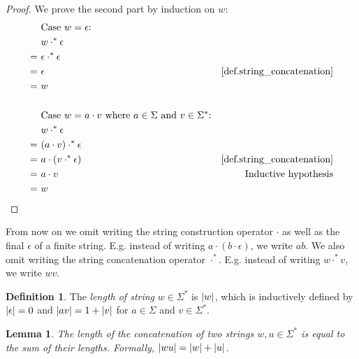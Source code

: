 \documentclass{report}
\DeclarePairedDelimiter{\abs}{\lvert}{\rvert}
\newtheorem{lemma}[theorem]{Lemma}
\theoremstyle{definition}
\newtheorem{definition}[theorem]{Definition}
\begin{document}
\begin{appendices}
\begin{proof}
We prove the second part by induction on $w$:
\begin{align*}
& \text{Case } w = \epsilon \text{:} \\
& w \cdot^{\ast} \epsilon \\
= \ & \epsilon \cdot^{\ast} \epsilon \\
= \ & \epsilon
& \text{\cref{def.string_concatenation}} \\
= \ & w \\
\\
& \text{Case } w = a \cdot v \text{ where } a \in \Sigma \text{ and }
v \in \Sigma^{\ast} \text{:} \\
& w \cdot^{\ast} \epsilon \\
= \ & (a \cdot v) \cdot^{\ast} \epsilon \\
= \ & a \cdot (v \cdot^{\ast} \epsilon)
& \text{\cref{def.string_concatenation}} \\
= \ & a \cdot v
& \text{Inductive hypothesis} \\
= \ & w
\end{align*}
\end{proof}

From now on we omit writing the string construction operator $\cdot$ as well as
the final $\epsilon$ of a finite string. E.g. instead of writing
$a \cdot (b \cdot \epsilon)$, we write $ab$.
We also omit writing the string concatenation operator $\cdot^{\ast}$. E.g. instead
of writing $w \cdot^{\ast} v$, we write $wv$.

\begin{definition} \label{def.string_length}
The \emph{length of string} $w \in \Sigma^{\ast}$ is $\abs{w}$, which is inductively
defined by $\abs{\epsilon} = 0$ and $\abs{av} = 1 + \abs{v}$ for $a \in \Sigma$
and $v \in \Sigma^{\ast}$.
\end{definition}

\begin{lemma} \label{lma.string_concatenation_length}
The length of the concatenation of two strings $w, u \in \Sigma^{\ast}$ is equal
to the sum of their lengths. Formally, $\abs{wu} = \abs{w} + \abs{u}$.
\end{lemma}


\end{appendices}
\end{document}
